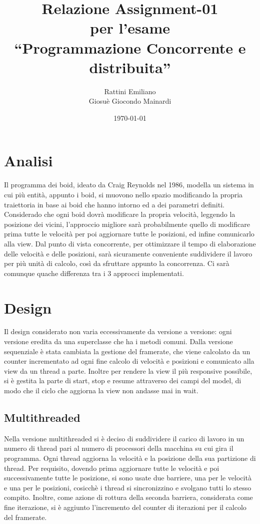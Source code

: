 \documentclass[a4paper,12pt]{report}
\title{Relazione Assignment-01 \\ per l'esame \\ ``Programmazione Concorrente e distribuita''}
\author{Rattini Emiliano\\Giosuè Giocondo Mainardi}
\date{\today}
\begin{document}
\maketitle

\tableofcontents

\chapter{Analisi}
Il programma dei boid, ideato da Craig Reynolds nel 1986, modella un sistema in cui più entità, appunto i boid,
si muovono nello spazio modificando la propria traiettoria in base ai boid che hanno intorno ed a dei parametri definiti.
Considerado che ogni boid dovrà modificare la propria velocità, leggendo la posizione dei vicini, l'approccio migliore
sarà probabilmente quello di modificare prima tutte le velocità per poi aggiornare tutte le posizioni, ed infine
comunicarlo alla view.
Dal punto di vista concorrente, per ottimizzare il tempo di elaborazione delle velocità e delle posizioni, sarà
sicuramente conveniente suddividere il lavoro per più unità di calcolo, così da sfruttare appunto la concorrenza.
Ci sarà comunque quache differenza tra i 3 approcci implementati.

\chapter{Design}
Il design considerato non varia eccessivamente da versione a versione: ogni versione eredita da una superclasse che ha
i metodi comuni. Dalla versione sequenziale è stata cambiata la gestione del framerate, che viene calcolato da un counter
incrementato ad ogni fine calcolo di velocità e posizioni e comunicato alla view da un thread a parte.
Inoltre per rendere la view il più responsive possibile, si è gestita la parte di start, stop e resume attraverso dei
campi del model, di modo che il ciclo che aggiorna la view non andasse mai in wait.

\section{Multithreaded}
Nella versione multithreaded si è deciso di suddividere il carico di lavoro in un numero di thread pari al numero di processori
della macchina su cui gira il programma. Ogni thread aggiorna la velocità e la posizione della sua partizione di thread.
Per requisito, dovendo prima aggiornare tutte le velocità e poi successivamente tutte le posizione, si sono usate due barriere,
una per le velocità e una per le posizioni, cosicchè i thread si sincronizzino e svolgano tutti lo stesso compito.
Inoltre, come azione di rottura della seconda barriera, considerata come fine iterazione, si è aggiunto l'incremento del
counter di iterazioni per il calcolo del framerate.
\end{document}
